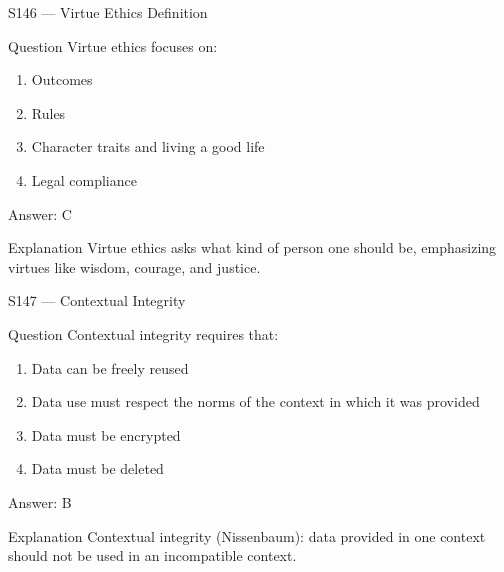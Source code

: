 \documentclass[aspectratio=169,8pt]{beamer}
\begin{document}
	\begin{frame}{S146 --- Virtue Ethics Definition}
		\begin{block}{Question}
			Virtue ethics focuses on:
			\begin{enumerate}
				\item Outcomes
				\item Rules
				\item Character traits and living a good life
				\item Legal compliance
			\end{enumerate}
		\end{block}
		\begin{exampleblock}{Answer: C}\end{exampleblock}
		\begin{block}{Explanation}
			Virtue ethics asks what kind of person one should be, emphasizing virtues like wisdom, courage, and justice.
		\end{block}
	\end{frame}
	
	\begin{frame}{S147 --- Contextual Integrity}
		\begin{block}{Question}
			Contextual integrity requires that:
			\begin{enumerate}
				\item Data can be freely reused
				\item Data use must respect the norms of the context in which it was provided
				\item Data must be encrypted
				\item Data must be deleted
			\end{enumerate}
		\end{block}
		\begin{exampleblock}{Answer: B}\end{exampleblock}
		\begin{block}{Explanation}
			Contextual integrity (Nissenbaum): data provided in one context should not be used in an incompatible context.
		\end{block}
	\end{frame}
	
\end{document}
